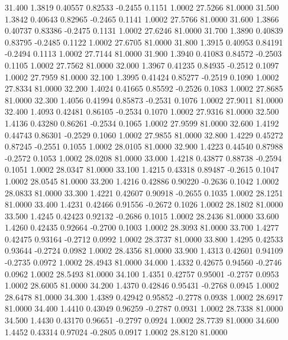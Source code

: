   31.400   1.3819   0.40557   0.82533  -0.2455   0.1151   1.0002  27.5266  81.0000
  31.500   1.3842   0.40643   0.82965  -0.2465   0.1141   1.0002  27.5766  81.0000
  31.600   1.3866   0.40737   0.83386  -0.2475   0.1131   1.0002  27.6246  81.0000
  31.700   1.3890   0.40839   0.83795  -0.2485   0.1122   1.0002  27.6705  81.0000
  31.800   1.3915   0.40953   0.84191  -0.2494   0.1113   1.0002  27.7144  81.0000
  31.900   1.3940   0.41083   0.84572  -0.2503   0.1105   1.0002  27.7562  81.0000
  32.000   1.3967   0.41235   0.84935  -0.2512   0.1097   1.0002  27.7959  81.0000
  32.100   1.3995   0.41424   0.85277  -0.2519   0.1090   1.0002  27.8334  81.0000
  32.200   1.4024   0.41665   0.85592  -0.2526   0.1083   1.0002  27.8685  81.0000
  32.300   1.4056   0.41994   0.85873  -0.2531   0.1076   1.0002  27.9011  81.0000
  32.400   1.4093   0.42481   0.86105  -0.2534   0.1070   1.0002  27.9316  81.0000
  32.500   1.4136   0.43280   0.86261  -0.2534   0.1065   1.0002  27.9599  81.0000
  32.600   1.4192   0.44743   0.86301  -0.2529   0.1060   1.0002  27.9855  81.0000
  32.800   1.4229   0.45272   0.87245  -0.2551   0.1055   1.0002  28.0105  81.0000
  32.900   1.4223   0.44540   0.87988  -0.2572   0.1053   1.0002  28.0208  81.0000
  33.000   1.4218   0.43877   0.88738  -0.2594   0.1051   1.0002  28.0347  81.0000
  33.100   1.4215   0.43318   0.89487  -0.2615   0.1047   1.0002  28.0545  81.0000
  33.200   1.4216   0.42886   0.90220  -0.2636   0.1042   1.0002  28.0833  81.0000
  33.300   1.4221   0.42607   0.90918  -0.2655   0.1035   1.0002  28.1251  81.0000
  33.400   1.4231   0.42466   0.91556  -0.2672   0.1026   1.0002  28.1802  81.0000
  33.500   1.4245   0.42423   0.92132  -0.2686   0.1015   1.0002  28.2436  81.0000
  33.600   1.4260   0.42435   0.92664  -0.2700   0.1003   1.0002  28.3093  81.0000
  33.700   1.4277   0.42475   0.93164  -0.2712   0.0992   1.0002  28.3737  81.0000
  33.800   1.4295   0.42533   0.93644  -0.2724   0.0982   1.0002  28.4356  81.0000
  33.900   1.4313   0.42601   0.94109  -0.2735   0.0972   1.0002  28.4943  81.0000
  34.000   1.4332   0.42675   0.94560  -0.2746   0.0962   1.0002  28.5493  81.0000
  34.100   1.4351   0.42757   0.95001  -0.2757   0.0953   1.0002  28.6005  81.0000
  34.200   1.4370   0.42846   0.95431  -0.2768   0.0945   1.0002  28.6478  81.0000
  34.300   1.4389   0.42942   0.95852  -0.2778   0.0938   1.0002  28.6917  81.0000
  34.400   1.4410   0.43049   0.96259  -0.2787   0.0931   1.0002  28.7338  81.0000
  34.500   1.4430   0.43170   0.96651  -0.2797   0.0924   1.0002  28.7739  81.0000
  34.600   1.4452   0.43314   0.97024  -0.2805   0.0917   1.0002  28.8120  81.0000
